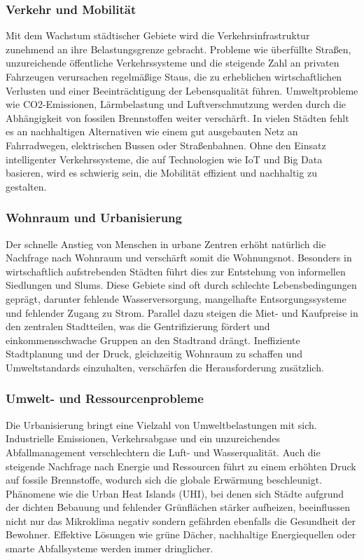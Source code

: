\documentclass[conference,compsoc,final,a4paper, onecolumn, 11pt]{IEEEtran}
\begin{document}
\subsubsection{Verkehr und Mobilität}
Mit dem Wachstum städtischer Gebiete wird die Verkehrsinfrastruktur zunehmend an ihre Belastungsgrenze gebracht. 
Probleme wie überfüllte Straßen, unzureichende öffentliche Verkehrssysteme und die steigende Zahl an privaten Fahrzeugen verursachen regelmäßige Staus, die zu erheblichen wirtschaftlichen Verlusten und einer Beeinträchtigung der Lebensqualität führen.
Umweltprobleme wie CO2-Emissionen, Lärmbelastung und Luftverschmutzung werden durch die Abhängigkeit von fossilen Brennstoffen weiter verschärft.
In vielen Städten fehlt es an nachhaltigen Alternativen wie einem gut ausgebauten Netz an Fahrradwegen, elektrischen Bussen oder Straßenbahnen. 
Ohne den Einsatz intelligenter Verkehrssysteme, die auf Technologien wie \ac{IoT} und Big Data basieren, wird es schwierig sein, die Mobilität effizient und nachhaltig zu gestalten.\autocite{mckinsey_smart_cities}


\subsubsection{Wohnraum und Urbanisierung}
Der schnelle Anstieg von Menschen in urbane Zentren erhöht natürlich die Nachfrage nach Wohnraum und verschärft somit die Wohnungsnot. 
Besonders in wirtschaftlich aufstrebenden Städten führt dies zur Entstehung von informellen Siedlungen und Slums.
Diese Gebiete sind oft durch schlechte Lebensbedingungen geprägt, darunter fehlende Wasserversorgung, mangelhafte Entsorgungssysteme und fehlender Zugang zu Strom.
Parallel dazu steigen die Miet- und Kaufpreise in den zentralen Stadtteilen, was die Gentrifizierung fördert und einkommensschwache Gruppen an den Stadtrand drängt.
Ineffiziente Stadtplanung und der Druck, gleichzeitig Wohnraum zu schaffen und Umweltstandards einzuhalten, verschärfen die Herausforderung zusätzlich.\autocite{un_habitat_world_cities}


\subsubsection{Umwelt- und Ressourcenprobleme}
Die Urbanisierung bringt eine Vielzahl von Umweltbelastungen mit sich. 
Industrielle Emissionen, Verkehrsabgase und ein unzureichendes Abfallmanagement verschlechtern die Luft- und Wasserqualität. 
Auch die steigende Nachfrage nach Energie und Ressourcen führt zu einem erhöhten Druck auf fossile Brennstoffe, wodurch sich die globale Erwärmung beschleunigt.
Phänomene wie die Urban Heat Islands (UHI), bei denen sich Städte aufgrund der dichten Bebauung und fehlender Grünflächen stärker aufheizen, beeinflussen nicht nur  das Mikroklima negativ sondern gefährden  ebenfalls die Gesundheit der Bewohner.
Effektive Lösungen wie grüne Dächer, nachhaltige Energiequellen oder smarte Abfallsysteme werden immer dringlicher. \autocite{mdpi_smart_cities_iot}
\end{document}
